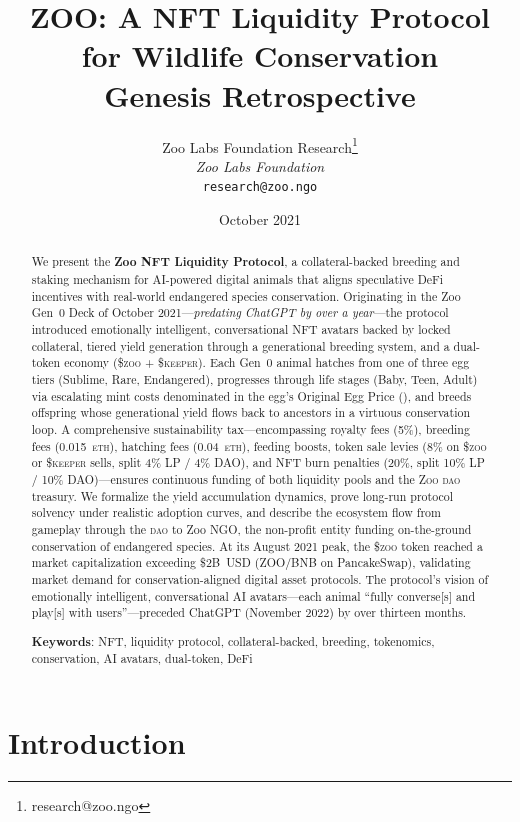 \documentclass[11pt,letterpaper]{article}
\title{\textbf{ZOO: A NFT Liquidity Protocol for Wildlife Conservation}\\[0.3em]
\large Genesis Retrospective}
\author{
Zoo Labs Foundation Research\thanks{research@zoo.ngo}\\
\textit{Zoo Labs Foundation}\\
\texttt{research@zoo.ngo}
}
\date{October 2021}
\newcommand{\Zoo}{\textsc{Zoo}}
\newcommand{\DAO}{\textsc{dao}}
\newcommand{\ZOO}{\$\textsc{zoo}}
\newcommand{\KEEPER}{\$\textsc{keeper}}
\newcommand{\OEP}{\text{OEP}}
\newcommand{\ETH}{\textsc{eth}}
\begin{document}
\zoocoverpage

\begin{abstract}
We present the \textbf{Zoo NFT Liquidity Protocol}, a collateral-backed breeding and staking
mechanism for AI-powered digital animals that aligns speculative DeFi incentives with real-world
endangered species conservation. Originating in the Zoo Gen~0 Deck of October
2021---\emph{predating ChatGPT by over a year}---the protocol introduced emotionally intelligent,
conversational NFT avatars backed by locked collateral, tiered yield generation through a
generational breeding system, and a dual-token economy (\ZOO{} + \KEEPER{}).  Each Gen~0
animal hatches from one of three egg tiers (Sublime, Rare, Endangered), progresses through life
stages (Baby, Teen, Adult) via escalating mint costs denominated in the egg's Original Egg Price
(\OEP{}), and breeds offspring whose generational yield flows back to ancestors in a virtuous
conservation loop.  A comprehensive sustainability tax---encompassing royalty fees (5\%), breeding
fees (0.015~\ETH{}), hatching fees (0.04~\ETH{}), feeding boosts, token sale levies (8\% on
\ZOO{} or \KEEPER{} sells, split 4\% LP / 4\% DAO), and NFT burn penalties (20\%, split 10\%
LP / 10\% DAO)---ensures continuous funding of both liquidity pools and the \Zoo{} \DAO{}
treasury.  We formalize the yield accumulation dynamics, prove long-run protocol solvency under
realistic adoption curves, and describe the ecosystem flow from gameplay through the \DAO{} to
Zoo NGO, the non-profit entity funding on-the-ground conservation of endangered species.  At its
August 2021 peak, the \ZOO{} token reached a market capitalization exceeding \$2B~USD
(ZOO/BNB on PancakeSwap), validating market demand for conservation-aligned digital asset
protocols.  The protocol's vision of emotionally intelligent, conversational AI avatars---each
animal ``fully converse[s] and play[s] with users''---preceded ChatGPT (November 2022) by over
thirteen months.

\textbf{Keywords}: NFT, liquidity protocol, collateral-backed, breeding, tokenomics, conservation,
AI avatars, dual-token, DeFi
\end{abstract}

\section{Introduction}
\label{sec:intro}
\end{document}
